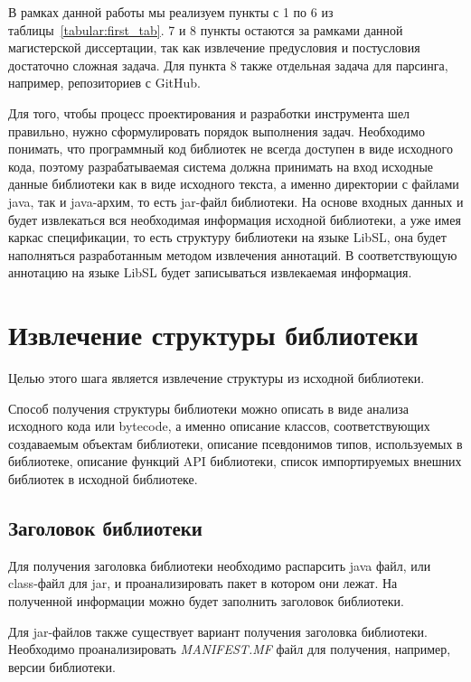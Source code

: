 В рамках данной работы мы реализуем пункты с 1 по 6 из таблицы~\ref{tabular:first_tab}.
7 и 8 пункты остаются за рамками данной магистерской диссертации, так как извлечение предусловия и постусловия достаточно сложная задача.
Для пункта 8 также отдельная задача для парсинга, например, репозиториев с GitHub.

Для того, чтобы процесс проектирования и разработки инструмента шел правильно, нужно сформулировать порядок выполнения задач.
Необходимо понимать, что программный код библиотек не всегда доступен в виде исходного кода, поэтому разрабатываемая система должна принимать на вход исходные данные библиотеки как в виде исходного текста, а именно директории с файлами java, так и java-архим, то есть jar-файл библиотеки.
На основе входных данных и будет извлекаться вся необходимая информация исходной библиотеки, а уже имея каркас спецификации, то есть структуру библиотеки на языке LibSL, она будет наполняться разработанным методом извлечения аннотаций.
В соответствующую аннотацию на языке LibSL будет записываться извлекаемая информация.

\section{Извлечение структуры библиотеки}

Целью этого шага является извлечение структуры из исходной библиотеки.

Способ получения структуры библиотеки можно описать в виде анализа исходного кода или bytecode, а именно описание классов, соответствующих создаваемым объектам библиотеки, описание псевдонимов типов, используемых в библиотеке, описание функций API библиотеки, список импортируемых внешних библиотек в исходной библиотеке.

\subsection{Заголовок библиотеки}

Для получения заголовка библиотеки необходимо распарсить java файл, или class-файл для jar, и проанализировать пакет в котором они лежат.
На полученной информации можно будет заполнить заголовок библиотеки.

Для jar-файлов также существует вариант получения заголовка библиотеки. Необходимо проанализировать \textit{MANIFEST.MF} файл для получения, например, версии библиотеки.

